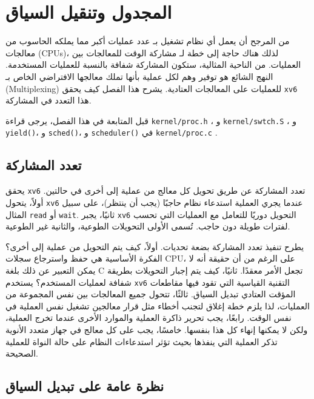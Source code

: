 \chapter{المجدول وتنقيل السياق}
\label{CH:SCHED}

من المرجح أن يعمل أي نظام تشغيل بـ عدد عمليات أكبر مما يملكه الحاسوب من معالجات (CPUs)، لذلك هناك حاجة إلى خطة لـ مشاركة الوقت للمعالجات بين العمليات.
من الناحية المثالية، ستكون المشاركة شفافة بالنسبة للعمليات المستخدمة.
النهج الشائع هو توفير وهم لكل عملية بأنها تملك معالجها الافتراضي الخاص بـ  (Multiplexing) للعمليات على المعالجات العتادية.
يشرح هذا الفصل كيف يحقق \texttt{xv6} هذا التعدد في المشاركة.

قبل المتابعة في هذا الفصل، يرجى قراءة \lstinline{kernel/proc.h} ، و \lstinline{kernel/swtch.S} ، و {\tt yield()}، و {\tt sched()}، و {\tt scheduler()} في \lstinline{kernel/proc.c} .

\section{تعدد المشاركة}
\label{sec:multiplexing}

يحقق \texttt{xv6} تعدد المشاركة عن طريق تحويل كل معالج من عملية إلى أخرى في حالتين.
أولاً، يتحول \texttt{xv6} عندما يجري العملية استدعاء نظام حاجبًا (يجب أن ينتظر)، على سبيل المثال \lstinline{read} أو \lstinline{wait}.
ثانيًا، يجبر \texttt{xv6} التحويل دوريًا للتعامل مع العمليات التي تحسب لفترات طويلة دون حاجب.
تُسمى الأولى التحويلات الطوعية، والثانية غير الطوعية.

يطرح تنفيذ تعدد المشاركة بضعة تحديات.
أولاً، كيف يتم التحويل من عملية إلى أخرى؟
الفكرة الأساسية هي حفظ واسترجاع سجلات CPU، على الرغم من أن حقيقة أنه لا يمكن التعبير عن ذلك بلغة C تجعل الأمر معقدًا.
ثانيًا، كيف يتم إجبار التحويلات بطريقة شفافة لعمليات المستخدم؟
يستخدم \texttt{xv6} التقنية القياسية التي تقود فيها مقاطعات المؤقت العتادي تبديل السياق.
ثالثًا، تتحول جميع المعالجات بين نفس المجموعة من العمليات، لذا يلزم خطة إغلاق لتجنب أخطاء مثل قرار معالجين تشغيل نفس العملية في نفس الوقت.
رابعًا، يجب تحرير ذاكرة العملية والموارد الأخرى عندما تخرج العملية، ولكن لا يمكنها إنهاء كل هذا بنفسها.
خامسًا، يجب على كل معالج في جهاز متعدد الأنوية تذكر العملية التي ينفذها بحيث تؤثر استدعاءات النظام على حالة النواة للعملية الصحيحة.

\section{نظرة عامة على تبديل السياق}
\label{sec:context_switch_overview}

